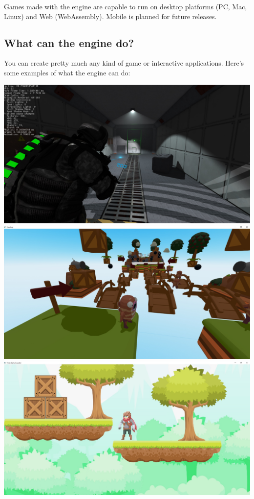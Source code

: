\documentclass[
]{book}
\theoremstyle{definition}
\theoremstyle{definition}
\theoremstyle{definition}
\theoremstyle{definition}
\theoremstyle{remark}
\begin{document}
Games made with the engine are capable to run on desktop platforms (PC, Mac, Linux) and Web (WebAssembly). Mobile is planned for future releases.

\subsection{What can the engine do?}\label{what-can-the-engine-do}

You can create pretty much any kind of game or interactive applications. Here's some examples of what the engine can do:

\includegraphics{images/introduction_example1.jpg}
\includegraphics{images/introduction_example2.jpg}
\includegraphics{images/introduction_example3.jpg}
\end{document}
